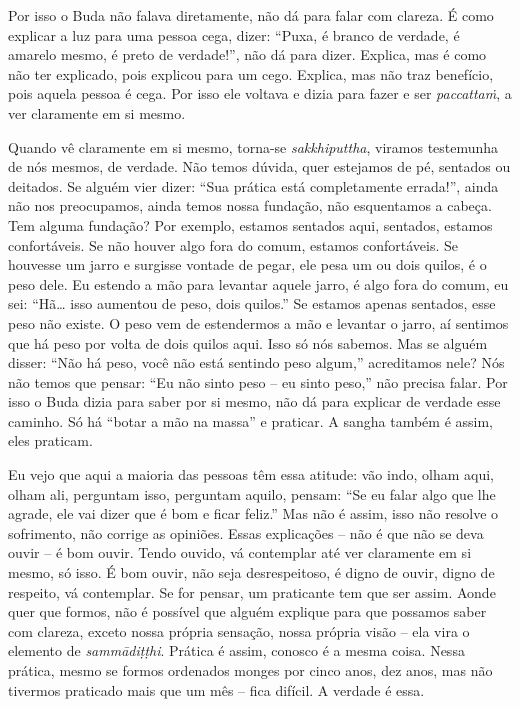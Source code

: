 Por isso o Buda não falava diretamente, não dá para falar com
clareza. É como explicar a luz para uma pessoa cega, dizer: “Puxa, é
branco de verdade, é amarelo mesmo, é preto de verdade!”, não dá para
dizer. Explica, mas é como não ter explicado, pois explicou para um
cego. Explica, mas não traz benefício, pois aquela pessoa é cega. Por
isso ele voltava e dizia para fazer e ser \emph{paccattaṁ}, a ver
claramente em si mesmo. 

Quando vê claramente em si mesmo, torna-se \emph{sakkhiputtha},
viramos testemunha de nós mesmos, de verdade. Não temos dúvida, quer
estejamos de pé, sentados ou deitados. Se alguém vier dizer: “Sua
prática está completamente errada!”, ainda não nos preocupamos, ainda
temos nossa fundação, não esquentamos a cabeça. Tem alguma fundação?
Por exemplo, estamos sentados aqui, sentados, estamos confortáveis. Se
não houver algo fora do comum, estamos confortáveis. Se houvesse um
jarro e surgisse vontade de pegar, ele pesa um ou dois quilos, é o peso
dele. Eu estendo a mão para levantar aquele jarro, é algo fora do
comum, eu sei: “Hã\ldots{} isso aumentou de peso, dois quilos.” Se estamos
apenas sentados, esse peso não existe. O peso vem de estendermos a mão
e levantar o jarro, aí sentimos que há peso por volta de dois quilos
aqui. Isso só nós sabemos. Mas se alguém disser: “Não há peso, você não
está sentindo peso algum,” acreditamos nele? Nós não temos que pensar:
“Eu não sinto peso – eu sinto peso,” não precisa falar. Por isso o Buda
dizia para saber por si mesmo, não dá para explicar de verdade esse
caminho. Só há “botar a mão na massa” e praticar. A sangha também é
assim, eles praticam.

Eu vejo que aqui a maioria das pessoas têm essa atitude: vão indo,
olham aqui, olham ali, perguntam isso, perguntam aquilo, pensam: “Se eu
falar algo que lhe agrade, ele vai dizer que é bom e ficar feliz.” Mas
não é assim, isso não resolve o sofrimento, não corrige as opiniões.
Essas explicações – não é que não se deva ouvir – é bom ouvir. Tendo
ouvido, vá contemplar até ver claramente em si mesmo, só isso. É bom
ouvir, não seja desrespeitoso, é digno de ouvir, digno de respeito, vá
contemplar. Se for pensar, um praticante tem que ser assim. Aonde quer
que formos, não é possível que alguém explique para que possamos saber
com clareza, exceto nossa própria sensação, nossa própria visão – ela
vira o elemento de \emph{sammādiṭṭhi}. Prática é assim, conosco é a
mesma coisa. Nessa prática, mesmo se formos ordenados monges por cinco
anos, dez anos, mas não tivermos praticado mais que um mês – fica
difícil. A verdade é essa. 

